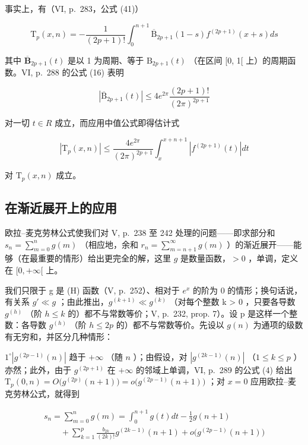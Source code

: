 事实上，有（VI, p.~283，公式 (41)）

\[
\mathrm{T} _ {p} (x, n) = - \frac {1}{(2 p + 1) !} \int_ {0} ^ {n + 1} \overline {{\mathrm{B}}} _ {2 p + 1} (1 - s) f ^ {(2 p + 1)} (x + s) d s\tag{2}
\]

其中 \(\overline{\mathbf{B}}_{2p + 1}(t)\) 是以 1 为周期、等于 \(\mathrm{B}_{2p + 1}(t)\) （在区间 {[}0, 1{[} 上）的周期函数。VI, p.~288 的公式 (16) 表明

\[
\left| \overline {{{{\mathrm{B}}}}} _ {2 p + 1} (t) \right| \leqslant 4 e ^ {2 \pi} \frac {(2 p + 1) !}{(2 \pi) ^ {2 p + 1}}\tag{3}
\]

对一切 \(t \in R\) 成立，而应用中值公式即得估计式

\[
\left| \mathrm{T} _ {p} (x, n) \right| \leqslant \frac {4 e ^ {2 \pi}}{(2 \pi) ^ {2 p + 1}} \int_ {x} ^ {x + n + 1} \left| f ^ {(2 p + 1)} (t) \right| d t\tag{4}
\]

对 \(\mathrm{T}_p(x,n)\) 成立。

\subsection{在渐近展开上的应用}

欧拉–麦克劳林公式使我们对 V, p.~238 至 242 处理的问题——即求部分和 \(s_n = \sum_{m=0}^{n} g(m)\) （相应地，余和 \(r_n = \sum_{m=n+1}^{\infty} g(m)\) ）的渐近展开——能够（在最重要的情形）给出更完全的解，这里 \(g\) 是数量函数，\(> 0\) ，单调，定义在 \([0, +\infty[\) 上。

我们只限于 g 是 (H) 函数（V, p.~252）、相对于 \(e^{x}\) 的阶为 0 的情形；换句话说，有关系 \(g' \ll g\) ；由此推出，\(g^{(k+1)} \ll g^{(k)}\) （对每个整数 k \textgreater{} 0 ，只要各导数 \(g^{(h)}\) （阶 \(h \leqslant k\) 的）都不与常数等价；V, p.~232, prop. 7）。设 p 是这样一个整数：各导数 \(g^{(h)}\) （阶 \(h \leqslant 2p\) 的）都不与常数等价。先设以 \(g(n)\) 为通项的级数有无穷和，并区分几种情形：

\(1^{\circ}\left|g^{(2p - 1)}(n)\right|\) 趋于 \(+\infty\) （随 \(n\) ）；由假设，对 \(\left|g^{(2k - 1)}(n)\right|\) （\(1\leqslant k\leqslant p\) ）亦然；此外，由于 \(g^{(2p + 1)}\) 在 \(+\infty\) 的邻域上单调，VI, p.~289 的公式 (4) 给出 \(\mathrm{T}_p(0,n) = O\big(g^{(2p)}(n + 1)\big) = o\big(g^{(2p - 1)}(n + 1)\big)\) ；对 \(x = 0\) 应用欧拉–麦克劳林公式，就得到

\[
\begin{array}{l} s _ {n} = \sum_ {m = 0} ^ {n} g (m) = \int_ {0} ^ {n + 1} g (t) d t - \frac {1}{2} g (n + 1) \\ \qquad + \sum_ {k = 1} ^ {p} \frac {b _ {2 k}}{(2 k) !} g ^ {(2 k - 1)} (n + 1) + o \big (g ^ {(2 p - 1)} (n + 1) \big) \end{array}
\]

